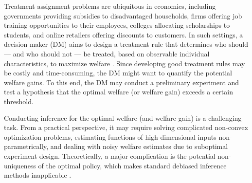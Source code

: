 \documentclass[12pt]{article}
\numberwithin{equation}{section}
\theoremstyle{plain}                         %
\theoremstyle{definition}                  %
\theoremstyle{remark}                      %
\begin{document}


Treatment assignment problems are ubiquitous in economics, including governments providing subsidies to disadvantaged households, firms offering job training opportunities to their employees, colleges allocating scholarships to students, and online retailers offering discounts to customers. In such settings, a decision-maker (DM) aims to design a treatment rule that determines who should --- and who should not --- be treated, based on observable individual characteristics, to maximize welfare \citep{Manski2004}. Since developing good treatment rules may be costly and time-consuming, the DM might want to quantify the potential welfare gains. To this end, the DM may conduct a preliminary experiment and test a hypothesis that the optimal welfare (or welfare gain) exceeds a certain threshold.


Conducting inference for the optimal welfare (and welfare gain) is a challenging task. From a practical perspective, it may require solving complicated non-convex optimization problems, estimating functions of high-dimensional inputs non-parametrically, and dealing with noisy welfare estimates due to suboptimal experiment design. Theoretically, a major complication is the potential non-uniqueness of the optimal policy, which makes standard debiased inference methods inapplicable \citep{HiranoPorter2012, LuedtkeLaan}.



\end{document}

